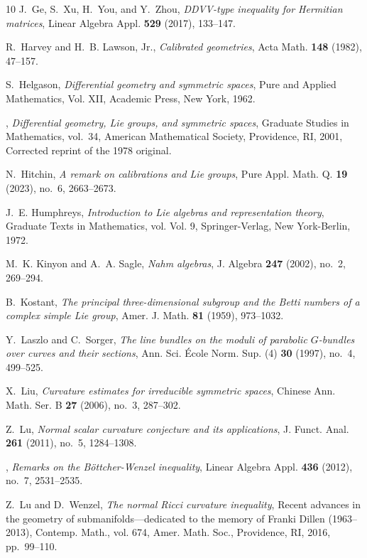 \documentclass [leqno, 10pt]{amsart}
\theoremstyle{definition}
\numberwithin{equation}{section}
\begin{document}
\begin{thebibliography}{10}
J.~Ge, S.~Xu, H.~You, and Y.~Zhou, \emph{{DDVV}-type inequality for {H}ermitian
  matrices}, Linear Algebra Appl. \textbf{529} (2017), 133--147.

R.~Harvey and H.~B. Lawson, Jr., \emph{Calibrated geometries}, Acta Math.
  \textbf{148} (1982), 47--157.

S.~Helgason, \emph{Differential geometry and symmetric spaces}, Pure and
  Applied Mathematics, Vol. XII, Academic Press, New York, 1962.

\bysame, \emph{Differential geometry, {L}ie groups, and symmetric spaces},
  Graduate Studies in Mathematics, vol.~34, American Mathematical Society,
  Providence, RI, 2001, Corrected reprint of the 1978 original.

N.~Hitchin, \emph{A remark on calibrations and {L}ie groups}, Pure Appl. Math.
  Q. \textbf{19} (2023), no.~6, 2663--2673.

J.~E. Humphreys, \emph{Introduction to {L}ie algebras and representation
  theory}, Graduate Texts in Mathematics, vol. Vol. 9, Springer-Verlag, New
  York-Berlin, 1972.

M.~K. Kinyon and A.~A. Sagle, \emph{Nahm algebras}, J. Algebra \textbf{247}
  (2002), no.~2, 269--294.

B.~Kostant, \emph{The principal three-dimensional subgroup and the {B}etti
  numbers of a complex simple {L}ie group}, Amer. J. Math. \textbf{81} (1959),
  973--1032.

Y.~Laszlo and C.~Sorger, \emph{The line bundles on the moduli of parabolic
  {$G$}-bundles over curves and their sections}, Ann. Sci. \'Ecole Norm. Sup.
  (4) \textbf{30} (1997), no.~4, 499--525.

X.~Liu, \emph{Curvature estimates for irreducible symmetric spaces}, Chinese
  Ann. Math. Ser. B \textbf{27} (2006), no.~3, 287--302.

Z.~Lu, \emph{Normal scalar curvature conjecture and its applications}, J.
  Funct. Anal. \textbf{261} (2011), no.~5, 1284--1308.

\bysame, \emph{Remarks on the {B}\"ottcher-{W}enzel inequality}, Linear Algebra
  Appl. \textbf{436} (2012), no.~7, 2531--2535.

Z.~Lu and D.~Wenzel, \emph{The normal {R}icci curvature inequality}, Recent
  advances in the geometry of submanifolds---dedicated to the memory of
  {F}ranki {D}illen (1963--2013), Contemp. Math., vol. 674, Amer. Math. Soc.,
  Providence, RI, 2016, pp.~99--110.


\end{thebibliography}
\end{document}
